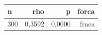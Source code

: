 \begin{tabular}{lrrr}
\hline
n & rho & p & forca \\
\hline
300 & 0,3592 & 0,0000 & fraca \\
\hline
\end{tabular}
